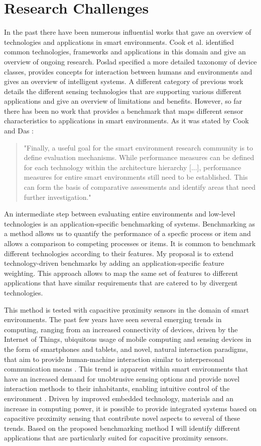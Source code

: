 \section{Research Challenges}
In the past there have been numerous influential works that gave an overview of technologies and applications in smart environments. Cook et al. identified common technologies, frameworks and applications in this domain and give an overview of ongoing research. Poslad specified a more detailed taxonomy of device classes, provides concepts for interaction between humans and environments and gives an overview of intelligent systems. A different category  of previous work details the different sensing technologies that are supporting various different applications and give an overview of limitations and benefits. However, so far there has been no work that provides a benchmark that maps different sensor characteristics to applications in smart environments. As it was stated by Cook and Das \cite{cook2007smart}:
\begin{quote}
"Finally, a useful goal for the smart environment research community is to define evaluation mechanisms. While performance measures can be defined for each technology within the architecture hierarchy [...], performance measures for entire smart environments still need to be established. This can form the basis of comparative assessments and identify areas that need further investigation."
\end{quote}
An intermediate step between evaluating entire environments and low-level technologies is an application-specific benchmarking of systems. Benchmarking as a method allows us to quantify the performance of a specfic process or item and allows a comparison to competing processes or items. It is common to benchmark different technologies according to their features. My proposal is to extend technology-driven benchmarks by adding an application-specific feature weighting. This approach allows to map the same set of features to different applications that have similar requirements that are catered to by divergent technologies.

This method is tested with capacitive proximity sensors in the domain of smart environments. The past few years have seen several emerging trends in computing, ranging from an increased connectivity of devices, driven by the Internet of Things, ubiquitous usage of mobile computing and sensing devices in the form of smartphones and tablets, and novel, natural interaction paradigms, that aim to provide human-machine interaction similar to interpersonal communication means \cite{Valli2008}. This trend is apparent within smart environments that have an increased demand for unobtrusive sensing options and provide novel interaction methods to their inhabitants, enabling intuitive control of the environment \cite{poslad2011ubiquitous}. Driven by improved embedded technology, materials and an increase in computing power, it is possible to provide integrated systems based on capacitive proximity sensing that contribute novel aspects to several of these trends. Based on the proposed benchmarking method I will identify different applications that are particularly suited for capacitive proximity sensors.


